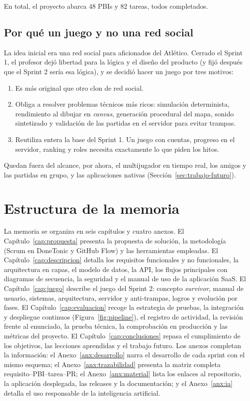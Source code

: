 En total, el proyecto abarca 48 PBIs y 82 tareas, todos completados.

\subsection{Por qué un juego y no una red social}

La idea inicial era una red social para aficionados del Atlético. Cerrado el Sprint 1, el profesor dejó libertad para la lógica y el diseño del producto (y fijó después que el Sprint 2 sería esa lógica), y se decidió hacer un juego por tres motivos:

\begin{enumerate}
    \item Es más original que otro clon de red social.
    \item Obliga a resolver problemas técnicos más ricos: simulación determinista, rendimiento al dibujar en \textit{canvas}, generación procedural del mapa, sonido sintetizado y validación de las partidas en el servidor para evitar trampas.
    \item Reutiliza entera la base del Sprint 1. Un juego con cuentas, progreso en el servidor, ranking y roles necesita exactamente lo que piden los hitos.
\end{enumerate}

Quedan fuera del alcance, por ahora, el multijugador en tiempo real, los amigos y las partidas en grupo, y las aplicaciones nativas (Sección~\ref{sec:trabajo-futuro}).

\section{Estructura de la memoria}

La memoria se organiza en seis capítulos y cuatro anexos. El Capítulo~\ref{cap:propuesta} presenta la propuesta de solución, la metodología (Scrum en DoneTonic y GitHub Flow) y las herramientas empleadas. El Capítulo~\ref{cap:descripcion} detalla los requisitos funcionales y no funcionales, la arquitectura en capas, el modelo de datos, la API, los flujos principales con diagramas de secuencia, la seguridad y el manual de uso de la aplicación SaaS. El Capítulo~\ref{cap:juego} describe el juego del Sprint 2: concepto \textit{survivor}, manual de usuario, sistemas, arquitectura, servidor y anti-trampas, logros y evolución por fases. El Capítulo~\ref{cap:evaluacion} recoge la estrategia de pruebas, la integración y despliegue continuos (Figura~\ref{fig:pipeline}), el registro de actividad, la revisión frente al enunciado, la prueba técnica, la comprobación en producción y las métricas del proyecto. El Capítulo~\ref{cap:conclusiones} repasa el cumplimiento de los objetivos, las lecciones aprendidas y el trabajo futuro. Los anexos completan la información: el Anexo~\ref{anx:desarrollo} narra el desarrollo de cada sprint con el mismo esquema; el Anexo~\ref{anx:trazabilidad} presenta la matriz completa requisito–PBI–tarea–PR; el Anexo~\ref{anx:material} lista los enlaces al repositorio, la aplicación desplegada, las releases y la documentación; y el Anexo~\ref{anx:ia} detalla el uso responsable de la inteligencia artificial.
